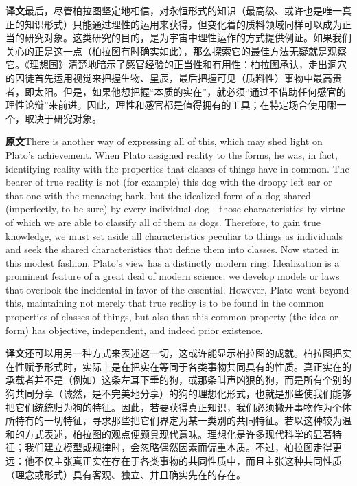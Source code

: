 \documentclass[UTF8,zihao=-4]{ctexart}
\newcommand{\BodyFont}{\fontsize{10.5pt}{15.5pt}\selectfont}
\newcommand{\origlabel}{\textbf{原文}\quad}
\newcommand{\translabel}{\textbf{译文}\quad}
\newcommand{\orig}{\par\noindent\begingroup\BodyFont\origlabel}
\newcommand{\zhline}[1]{\par\endgroup\noindent\begingroup\BodyFont\translabel #1\par\endgroup\vspace{0.35em}}
\begin{document}
\zhline{最后，尽管柏拉图坚定地相信，对永恒形式的知识（最高级、或许也是唯一真正的知识形式）只能通过理性的运用来获得，但变化着的质料领域同样可以成为正当的研究对象。这类研究的目的，是为宇宙中理性运作的方式提供例证。如果我们关心的正是这一点（柏拉图有时确实如此），那么探索它的最佳方法无疑就是观察它。《理想国》清楚地暗示了感官经验的正当性和有用性：柏拉图承认，走出洞穴的囚徒首先运用视觉来把握生物、星辰，最后把握可见（质料性）事物中最高贵者，即太阳。但是，如果他想把握“本质的实在”，就必须“通过不借助任何感官的理性论辩”来前进。因此，理性和感官都是值得拥有的工具；在特定场合使用哪一个，取决于研究对象。}

\orig There is another way of expressing all of this, which may shed light on Plato's achievement. When Plato assigned reality to the forms, he was, in fact, identifying reality with the properties that classes of things have in common. The bearer of true reality is not (for example) this dog with the droopy left ear or that one with the menacing bark, but the idealized form of a dog shared (imperfectly, to be sure) by every individual dog---those characteristics by virtue of which we are able to classify all of them as dogs. Therefore, to gain true knowledge, we must set aside all characteristics peculiar to things as individuals and seek the shared characteristics that define them into classes. Now stated in this modest fashion, Plato's view has a distinctly modern ring. Idealization is a prominent feature of a great deal of modern science; we develop models or laws that overlook the incidental in favor of the essential. However, Plato went beyond this, maintaining not merely that true reality is to be found in the common properties of classes of things, but also that this common property (the idea or form) has objective, independent, and indeed prior existence.

\zhline{还可以用另一种方式来表述这一切，这或许能显示柏拉图的成就。柏拉图把实在性赋予形式时，实际上是在把实在等同于各类事物共同具有的性质。真正实在的承载者并不是（例如）这条左耳下垂的狗，或那条叫声凶狠的狗，而是所有个别的狗共同分享（诚然，是不完美地分享）的狗的理想化形式，也就是那些使我们能够把它们统统归为狗的特征。因此，若要获得真正知识，我们必须撇开事物作为个体所特有的一切特征，寻求那些把它们界定为某一类别的共同特征。若以这种较为温和的方式表述，柏拉图的观点便颇具现代意味。理想化是许多现代科学的显著特征；我们建立模型或规律时，会忽略偶然因素而偏重本质。不过，柏拉图走得更远：他不仅主张真正实在存在于各类事物的共同性质中，而且主张这种共同性质（理念或形式）具有客观、独立、并且确实先在的存在。}
\end{document}
